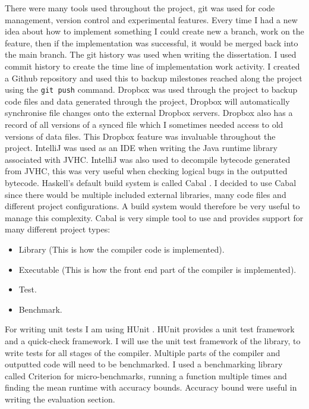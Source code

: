 \documentclass[float=false, crop=false]{standalone}
\begin{document}
There were many tools used throughout the project, git was used for 
code management, version control and experimental features. Every time
I had a new idea about how to implement something I could create new a 
branch, work on the feature, then if the implementation was successful, 
it would be merged back into the main branch. 
The git history was used when writing the dissertation.
I used commit history to create the time line
of implementation work activity. 
I created a Github repository and used this to backup milestones reached 
along the project using the \verb|git push| command.
Dropbox was used through the project to backup code files and data generated 
through the project, Dropbox will automatically synchronise file changes
onto the external Dropbox servers. Dropbox also has a record of all
versions of a synced file which I sometimes needed access to old versions
of data files. This Dropbox feature was invaluable throughout the project.
IntelliJ \cite{intellij-ide} was used as an IDE when writing the Java
runtime library associated with JVHC. IntelliJ was also used to decompile
bytecode generated from JVHC, this was very useful when checking logical
bugs in the outputted bytecode.
Haskell's default build system is called Cabal \cite{cabal}. I 
decided to use Cabal since there would be multiple included external libraries,
many code files and different project configurations.
A build system would therefore be very useful to manage this
complexity. Cabal is very simple tool to use and provides support
for many different project types:
  \begin{itemize}
    \item Library (This is how the compiler code is implemented).

    \item Executable (This is how the front end part of the compiler is 
      implemented).

    \item Test.

    \item Benchmark.
  \end{itemize}
For writing unit tests I am using HUnit \cite{hunit}.
HUnit provides a unit test framework and a quick-check framework. 
I will use the unit test framework of the library, 
to write tests for all stages of the compiler.
Multiple parts of the compiler and outputted code will
need to be benchmarked. I used a benchmarking library called
Criterion \cite{criterion} for micro-benchmarks, running a function
multiple times and finding the mean runtime with accuracy bounds.
Accuracy bound were useful in writing the evaluation section.
\end{document}
